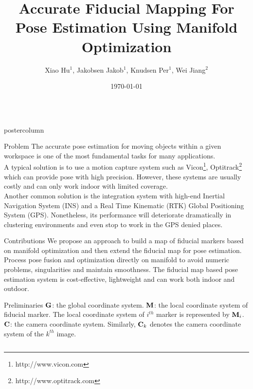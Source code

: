 \documentclass{beamer}
\title{\huge Accurate Fiducial Mapping For Pose Estimation Using Manifold Optimization}
\author{Xiao Hu$^{1}$, Jakobsen Jakob$^{1}$, Knudsen Per$^{1}$, Wei Jiang$^{2}$}
\institute[DTU]{$^{1}$National Space Institute, Technical University of Denmark \\ $^{2}$School of Electronic and Information Engineering
Beijing Jiaotong University}
\date{\today}
\newlength{\columnheight}
\begin{document}
\begin{frame}
\begin{columns}
	\begin{column}{.4\textwidth}
		\begin{beamercolorbox}[center]{postercolumn}
			\begin{minipage}{.98\textwidth}  %
				\parbox[t][\columnheight]{\textwidth}{ %
					\begin{myblock}{Problem}
						{The accurate pose estimation for moving objects
within a given workspace is one of the most fundamental tasks for
many applications. \\
A typical solution is to use a motion capture system
such as Vicon\footnote{http://www.vicon.com}, Optitrack\footnote{http://www.optitrack.com} which can provide pose with
high precision. However, these systems are usually costly and can only work indoor with limited coverage. \\
Another common solution is the integration system with high-end Inertial Navigation System (INS) and a Real Time Kinematic (RTK) Global Positioning
System (GPS). Nonetheless, its performance will deteriorate dramatically in clustering environments and even stop to work in the GPS denied places.}
					\end{myblock}
					\begin{myblock}{Contributions}
					We propose an approach to build a map of fiducial
markers based on manifold optimization and then extend the
fiducial map for pose estimation. Process pose fusion and optimization directly on manifold to avoid numeric problems, singularities and maintain smoothness. The fiducial map based pose estimation system is cost-effective, lightweight and can work both indoor and outdoor.
					\end{myblock}
					
\begin{block}{Preliminaries}
	$\bold{G}$: the global coordinate system. 
	$\bold{M}$: the local coordinate system of fiducial marker. The local 	coordinate system of $i^{th}$ marker is represented by $\bold{M}_{i}$. 	
	$\bold{C}$: the camera coordinate system. Similarly, $\bold{C}_{k}$ denotes the camera coordinate system of the $k^{th}$ image. 


\end{block}}
\end{minipage}
\end{beamercolorbox}
\end{column}
\end{columns}
\end{frame}
\end{document}
